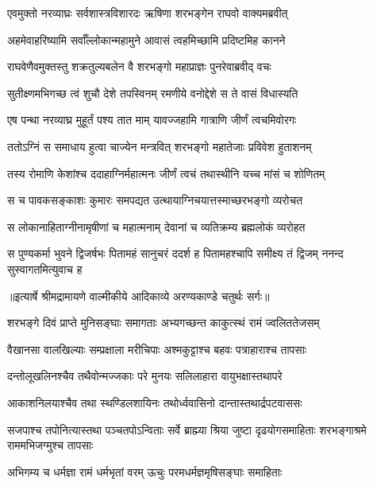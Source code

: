 \twolineshloka
{एवमुक्तो नरव्याघ्रः सर्वशास्त्रविशारदः}
{ऋषिणा शरभङ्गेन राघवो वाक्यमब्रवीत्} %

\twolineshloka
{अहमेवाहरिष्यामि सर्वाँल्लोकान्महामुने}
{आवासं त्वहमिच्छामि प्रदिष्टमिह कानने} %

\twolineshloka
{राघवेणैवमुक्तस्तु शक्रतुल्यबलेन वै}
{शरभङ्गो महाप्राज्ञः पुनरेवाब्रवीद् वचः} %

\twolineshloka
{सुतीक्ष्णमभिगच्छ त्वं शुचौ देशे तपस्विनम्}
{रमणीये वनोद्देशे स ते वासं विधास्यति} %

\twolineshloka
{एष पन्था नरव्याघ्र मुहूर्तं पश्य तात माम्}
{यावज्जहामि गात्राणि जीर्णं त्वचमिवोरगः} %

\twolineshloka
{ततोऽग्निं स समाधाय हुत्वा चाज्येन मन्त्रवित्}
{शरभङ्गो महातेजाः प्रविवेश हुताशनम्} %

\twolineshloka
{तस्य रोमाणि केशांश्च ददाहाग्निर्महात्मनः}
{जीर्णं त्वचं तथास्थीनि यच्च मांसं च शोणितम्} %

\twolineshloka
{स च पावकसङ्काशः कुमारः समपद्यत}
{उत्थायाग्निचयात्तस्माच्छरभङ्गो व्यरोचत} %

\twolineshloka
{स लोकानाहिताग्नीनामृषीणां च महात्मनाम्}
{देवानां च व्यतिक्रम्य ब्रह्मलोकं व्यरोहत} %

\fourlineindentedshloka
{स पुण्यकर्मा भुवने द्विजर्षभः}
{पितामहं सानुचरं ददर्श ह}
{पितामहश्चापि समीक्ष्य तं द्विजम्}
{ननन्द सुस्वागतमित्युवाच ह} %


{॥इत्यार्षे श्रीमद्रामायणे वाल्मीकीये आदिकाव्ये अरण्यकाण्डे चतुर्थः सर्गः॥}


\twolineshloka
{शरभङ्गे दिवं प्राप्ते मुनिसङ्घाः समागताः}
{अभ्यगच्छन्त काकुत्स्थं रामं ज्वलिततेजसम्} %

\twolineshloka
{वैखानसा वालखिल्याः सम्प्रक्षाला मरीचिपाः}
{अश्मकुट्टाश्च बहवः पत्राहाराश्च तापसाः} %

\twolineshloka
{दन्तोलूखलिनश्चैव तथैवोन्मज्जकाः परे}
{मुनयः सलिलाहारा वायुभक्षास्तथापरे} %

\twolineshloka
{आकाशनिलयाश्चैव तथा स्थण्डिलशायिनः}
{तथोर्ध्ववासिनो दान्तास्तथार्द्रपटवाससः} %

\threelineshloka
{सजपाश्च तपोनित्यास्तथा पञ्चतपोऽन्विताः}
{सर्वे ब्राह्म्या श्रिया जुष्टा दृढयोगसमाहिताः}
{शरभङ्गाश्रमे राममभिजग्मुश्च तापसाः} %

\twolineshloka
{अभिगम्य च धर्मज्ञा रामं धर्मभृतां वरम्}
{ऊचुः परमधर्मज्ञमृषिसङ्घाः समाहिताः} %

